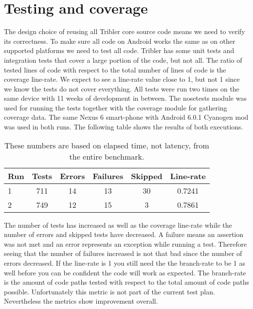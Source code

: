 \section{Testing and coverage}
The design choice of reusing all Tribler core source code means we need to verify its correctness.
To make sure all code on Android works the same as on other supported platforms we need to test all code.
Tribler has some unit tests and integration tests that cover a large portion of the code, but not all.
The ratio of tested lines of code with respect to the total number of lines of code is the coverage line-rate.
We expect to see a line-rate value close to 1, but not 1 since we know the tests do not cover everything.
All tests were run two times on the same device with 11 weeks of development in between.
The nosetests module was used for running the tests together with the coverage module for gathering coverage data.
The same Nexus 6 smart-phone with Android 6.0.1 Cyanogen mod was used in both runs.
The following table shows the results of both executions.
\begin{table}[h]
	\begin{tabular}{l | *{5}{c}}
		Run & Tests & Errors & Failures & Skipped & Line-rate \\ \hline
		1     & 711   & 14       & 13          & 30          & 0.7241 \\ \hline
		2     & 749   & 12       & 15          & 3            & 0.7861 \\ \hline
	\end{tabular}
	\caption[Total response time statistics]{These numbers are based on elapsed time, not latency, from the entire benchmark.}
	\label{table:testing_coverage}
\end{table}
The number of tests has increased as well as the coverage line-rate while the number of errors and skipped tests have decreased.
A failure means an assertion was not met and an error represents an exception while running a test.
Therefore seeing that the number of failures increased is not that bad since the number of errors decreased.
If the line-rate is 1 you still need the the branch-rate to be 1 as well before you can be confident the code will work as expected.
The branch-rate is the amount of code paths tested with respect to the total amount of code paths possible.
Unfortunately this metric is not part of the current test plan.
Nevertheless the metrics show improvement overall.


